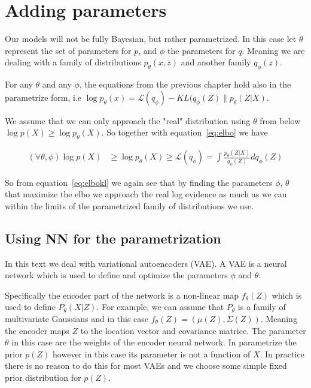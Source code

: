 \documentclass[11pt, a4paper]{report}
\theoremstyle{plain}
\theoremstyle{definition}
\theoremstyle{remark}
\begin{document}
\section{Adding parameters}

Our models will not be fully Bayesian, but rather parametrized.
In this case let $\theta$ represent the set of parameters for $p$, and $\phi$
the parameters for $q$. Meaning we are dealing with a family of distributions
$p_{\theta}(x,z)$ and another family $q_{\phi}(z)$.

For any $\theta$ and any $\phi$, the equations from the previous chapter hold
also in the parametrize form, i.e $\log p_{\theta}(x) = \mathcal{L}(q_{\phi}) -
KL(q_{\phi}(Z) \| p_{\theta}(Z|X)$.

We assume that we can only approach the "real" distribution using
$\theta$ from below $\log p(X) \geq \log p_{\theta}(X)$.
So together with equation~\ref{eq:elbo} we have

\begin{equation}\label{eq:parelbo}
\begin{aligned}
(\forall \theta, \phi)\log p(X) & \geq \log p_{\theta}(X) \geq \mathcal{L}(q_{\phi})
= \int \frac{p_{\theta}(Z|X)}{q_{\phi}(Z)} dq_{\phi}(Z)
\end{aligned}
\end{equation}

So from equation~\ref{eq:elbokl} we again see that by finding the parameters
$\phi$, $\theta$ that maximize the elbo we approach the real log evidence as much
as we can within the limits of the parametrized family of distributions we use.

\subsection{Using NN for the parametrization}
In this text we deal with variational autoencoders (VAE).
A VAE is a neural network which is used to define and optimize the parameters
$\phi$ and $\theta$.

Specifically the encoder part of the network is a non-linear map $f_{\theta}(Z)$ which is
used to define $P_{\theta}(X|Z)$. For example, we can assume that $P_{\theta}$
is a family of multivariate Gaussians and in this case $f_{\theta}(Z) =
(\mu(Z), \Sigma(Z))$. Meaning the encoder maps $Z$ to the location vector and
covariance matrice. The parameter $\theta$ in this case are the weights of the
encoder neural network. In parametrize the prior $p(Z)$ however in this case its
parameter is not a function of $X$. In practice there is no reason to do this
for most VAEs and we choose some simple fixed prior distribution for $p(Z)$.
\end{document}
